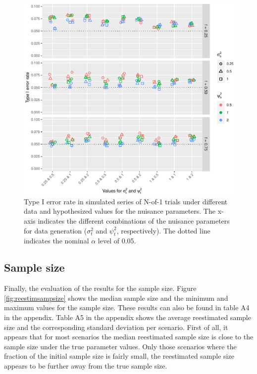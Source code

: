 \documentclass[AMA,STIX1COL,]{WileyNJD-v2}
\begin{document}
\begin{figure}

{\centering \includegraphics{Thesis_files/figure-latex/unnamed-chunk-6-1} 

}

\caption{Type I error rate in simulated series of N-of-1 trials under different data and hypothesized values for the nuisance parameters. The x-axis indicates the different combinations of the nuisance parameters for data generation ($\sigma_t^2$ and $\psi_t^2$, respectively). The dotted line indicates the nominal $\alpha$ level of 0.05. \label{fig:reestimalpha}}\label{fig:unnamed-chunk-6}
\end{figure}

\hypertarget{sample-size}{%
\subsection{Sample size}\label{sample-size}}

Finally, the evaluation of the results for the sample size. Figure \ref{fig:reestimsampsize} shows the median sample size and the minimum and maximum values for the sample size. These results can also be found in table A4 in the appendix. Table A5 in the appendix shows the average reestimated sample size and the corresponding standard deviation per scenario. First of all, it appears that for most scenarios the median reestimated sample size is close to the sample size under the true parameter values. Only those scenarios where the fraction of the initial sample size is fairly small, the reestimated sample size appears to be further away from the true sample size.
\end{document}
